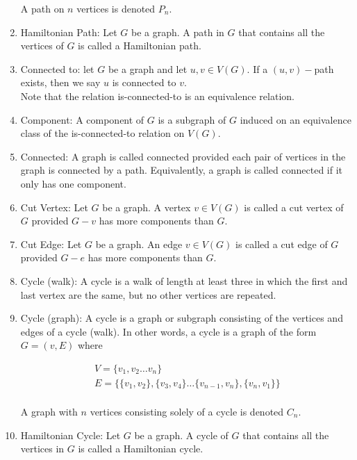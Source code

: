 \documentclass{article}
\begin{document}
\begin{enumerate}
		A path on $n$ vertices is denoted $P_n$.
		
		\item Hamiltonian Path: Let $G$ be a graph.
		A path in $G$ that contains all the vertices of $G$ is called a Hamiltonian path.
		
		\item Connected to: let $G$ be a graph and let $u,v\in V(G)$.
		If a $(u,v)-$path exists, then we say $u$ is connected to $v$.\\
		
		Note that the relation is-connected-to is an equivalence relation.
		
		\item Component: A component of $G$ is a subgraph of $G$ induced on an equivalence class of the is-connected-to relation on $V(G)$.
		
		\item Connected: A graph is called connected provided each pair of vertices in the graph is connected by a path.
		Equivalently, a graph is called connected if it only has one component.
		
		\item Cut Vertex: Let $G$ be a graph.
		A vertex $v\in V(G)$ is called a cut vertex of $G$ provided $G-v$ has more components than $G$.
		
		\item Cut Edge: Let $G$ be a graph.
		An edge $v\in V(G)$ is called a cut edge of $G$ provided $G-e$ has more components than $G$.
		
		\item Cycle (walk): A cycle is a walk of length at least three in which the first and last vertex are the same, but no other vertices are repeated.
		
		\item Cycle (graph): A cycle is a graph or subgraph consisting of the vertices and edges of a cycle (walk).
		In other words, a cycle is a graph of the form $G=(v,E)$ where
		
		\begin{gather*}
			V=\{v_1, v_2 \dots v_n\} \:\: \\
			E=\{\{v_1, v_2\}, \{v_3, v_4\} \dots \{v_{n-1}, v_n\},\{v_n, v_1\}\}\\
		\end{gather*}
		
		A graph with $n$ vertices consisting solely of a cycle is denoted $C_n$.
		
		\item Hamiltonian Cycle: Let $G$ be a graph.
		A cycle of $G$ that contains all the vertices in $G$ is called a Hamiltonian cycle.
		

\end{enumerate}
\end{document}
